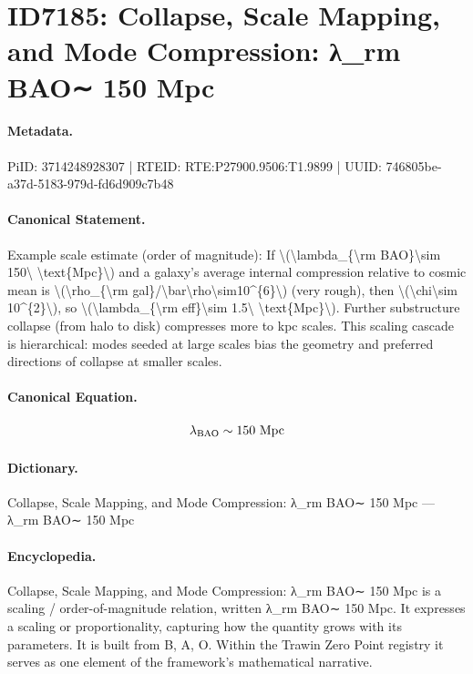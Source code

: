 \section*{ID7185: Collapse, Scale Mapping, and Mode Compression: λ\_rm BAO∼ 150 Mpc}
\paragraph{Metadata.}
PiID: 3714248928307 | RTEID: RTE:P27900.9506:T1.9899 | UUID: 746805be-a37d-5183-979d-fd6d909c7b48

\paragraph{Canonical Statement.}
Example scale estimate (order of magnitude): If \textbackslash{}(\textbackslash{}lambda\_\{\textbackslash{}rm BAO\}\textbackslash{}sim 150\textbackslash{} \textbackslash{}text\{Mpc\}\textbackslash{}) and a galaxy's average internal compression relative to cosmic mean is \textbackslash{}(\textbackslash{}rho\_\{\textbackslash{}rm gal\}/\textbackslash{}bar\textbackslash{}rho\textbackslash{}sim10\textasciicircum{}\{6\}\textbackslash{}) (very rough), then \textbackslash{}(\textbackslash{}chi\textbackslash{}sim 10\textasciicircum{}\{2\}\textbackslash{}), so \textbackslash{}(\textbackslash{}lambda\_\{\textbackslash{}rm eff\}\textbackslash{}sim 1.5\textbackslash{} \textbackslash{}text\{Mpc\}\textbackslash{}). Further substructure collapse (from halo to disk) compresses more to kpc scales. This scaling cascade is hierarchical: modes seeded at large scales bias the geometry and preferred directions of collapse at smaller scales.

\paragraph{Canonical Equation.}
\[
\lambda_{\rm BAO}\sim 150\ \text{Mpc}
\]

\paragraph{Dictionary.}
Collapse, Scale Mapping, and Mode Compression: λ\_rm BAO∼ 150 Mpc — λ\_rm BAO∼ 150 Mpc

\paragraph{Encyclopedia.}
Collapse, Scale Mapping, and Mode Compression: λ\_rm BAO∼ 150 Mpc is a scaling / order-of-magnitude relation, written λ\_rm BAO∼ 150 Mpc. It expresses a scaling or proportionality, capturing how the quantity grows with its parameters. It is built from B, A, O. Within the Trawin Zero Point registry it serves as one element of the framework's mathematical narrative.

